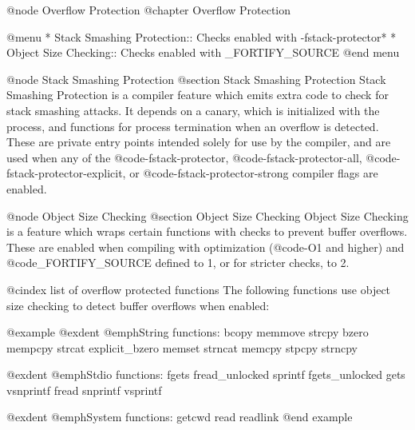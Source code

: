 @node Overflow Protection
@chapter Overflow Protection

@menu
* Stack Smashing Protection::    Checks enabled with -fstack-protector*
* Object Size Checking::         Checks enabled with _FORTIFY_SOURCE
@end menu

@node Stack Smashing Protection
@section Stack Smashing Protection
Stack Smashing Protection is a compiler feature which emits extra code
to check for stack smashing attacks.  It depends on a canary, which is
initialized with the process, and functions for process termination when
an overflow is detected.  These are private entry points intended solely
for use by the compiler, and are used when any of the @code{-fstack-protector},
@code{-fstack-protector-all}, @code{-fstack-protector-explicit}, or
@code{-fstack-protector-strong} compiler flags are enabled.

@node Object Size Checking
@section Object Size Checking
Object Size Checking is a feature which wraps certain functions with checks
to prevent buffer overflows.  These are enabled when compiling with
optimization (@code{-O1} and higher) and @code{_FORTIFY_SOURCE} defined
to 1, or for stricter checks, to 2.

@cindex list of overflow protected functions
The following functions use object size checking to detect buffer overflows
when enabled:

@example
@exdent @emph{String functions:}
bcopy           memmove         strcpy
bzero           mempcpy         strcat
explicit_bzero  memset          strncat
memcpy          stpcpy          strncpy

@exdent @emph{Stdio functions:}
fgets           fread_unlocked  sprintf
fgets_unlocked  gets            vsnprintf
fread           snprintf        vsprintf

@exdent @emph{System functions:}
getcwd          read            readlink
@end example

